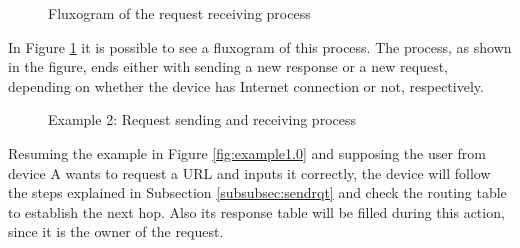 \begin{figure}[ht]
   \noindent{}
	\caption{\label{fig:rqtrcvflux} Fluxogram of the request receiving process}
\end{figure}

In Figure \ref{fig:rqtrcvflux} it is possible to see a fluxogram of this process. The process, as shown in the figure, ends either with sending a new response or a new request, depending on whether the device has Internet connection or not, respectively.

\begin{figure}[ht]
   \noindent{}
	\caption{\label{fig:example1.1} Example 2: Request sending and receiving process}
\end{figure}

Resuming the example in Figure \ref{fig:example1.0} and supposing the user from device A wants to request a \gls{URL} and inputs it correctly, the device will follow the steps explained in Subsection \ref{subsubsec:sendrqt} and check the routing table to establish the next hop. Also its response table will be filled during this action, since it is the owner of the request.

